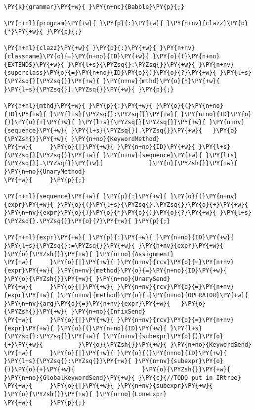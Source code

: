 \begin{Verbatim}[commandchars=\\\{\}]
\PY{k}{grammar}\PY{+w}{ }\PY{n+nc}{Babble}\PY{p}{;}

\PY{n+nl}{program}\PY{+w}{ }\PY{p}{:}\PY{+w}{ }\PY{n+nv}{clazz}\PY{o}{*}\PY{+w}{ }\PY{p}{;}

\PY{n+nl}{clazz}\PY{+w}{ }\PY{p}{:}\PY{+w}{ }\PY{n+nv}{classname}\PY{o}{=}\PY{n+no}{ID}\PY{+w}{ }\PY{o}{(}\PY{n+no}{EXTENDS}\PY{+w}{ }\PY{l+s}{\PYZsq{}:\PYZsq{}}\PY{+w}{ }\PY{n+nv}{superclass}\PY{o}{=}\PY{n+no}{ID}\PY{o}{)}\PY{o}{?}\PY{+w}{ }\PY{l+s}{\PYZsq{}[\PYZsq{}}\PY{+w}{ }\PY{n+nv}{mthd}\PY{o}{*}\PY{+w}{ }\PY{l+s}{\PYZsq{}].\PYZsq{}}\PY{+w}{ }\PY{p}{;}

\PY{n+nl}{mthd}\PY{+w}{ }\PY{p}{:}\PY{+w}{ }\PY{o}{(}\PY{n+no}{ID}\PY{+w}{ }\PY{l+s}{\PYZsq{}:\PYZsq{}}\PY{+w}{ }\PY{n+no}{ID}\PY{o}{)}\PY{o}{+}\PY{+w}{ }\PY{l+s}{\PYZsq{}[\PYZsq{}}\PY{+w}{ }\PY{n+nv}{sequence}\PY{+w}{ }\PY{l+s}{\PYZsq{}].\PYZsq{}}\PY{+w}{   }\PY{o}{\PYZsh{}}\PY{+w}{ }\PY{n+no}{KeywordMethod}
\PY{+w}{     }\PY{o}{|}\PY{+w}{ }\PY{n+no}{ID}\PY{+w}{ }\PY{l+s}{\PYZsq{}[\PYZsq{}}\PY{+w}{ }\PY{n+nv}{sequence}\PY{+w}{ }\PY{l+s}{\PYZsq{}].\PYZsq{}}\PY{+w}{             }\PY{o}{\PYZsh{}}\PY{+w}{ }\PY{n+no}{UnaryMethod}
\PY{+w}{     }\PY{p}{;}

\PY{n+nl}{sequence}\PY{+w}{ }\PY{p}{:}\PY{+w}{ }\PY{o}{(}\PY{n+nv}{expr}\PY{+w}{ }\PY{o}{(}\PY{l+s}{\PYZsq{}.\PYZsq{}}\PY{o}{+}\PY{+w}{ }\PY{n+nv}{expr}\PY{o}{)}\PY{o}{*}\PY{o}{)}\PY{o}{?}\PY{+w}{ }\PY{l+s}{\PYZsq{}.\PYZsq{}}\PY{o}{?}\PY{+w}{ }\PY{p}{;}

\PY{n+nl}{expr}\PY{+w}{ }\PY{p}{:}\PY{+w}{ }\PY{n+no}{ID}\PY{+w}{ }\PY{l+s}{\PYZsq{}:=\PYZsq{}}\PY{+w}{ }\PY{n+nv}{expr}\PY{+w}{                        }\PY{o}{\PYZsh{}}\PY{+w}{ }\PY{n+no}{Assignment}
\PY{+w}{     }\PY{o}{|}\PY{+w}{ }\PY{n+nv}{rcv}\PY{o}{=}\PY{n+nv}{expr}\PY{+w}{ }\PY{n+nv}{method}\PY{o}{=}\PY{n+no}{ID}\PY{+w}{                  }\PY{o}{\PYZsh{}}\PY{+w}{ }\PY{n+no}{UnarySend}
\PY{+w}{     }\PY{o}{|}\PY{+w}{ }\PY{n+nv}{rcv}\PY{o}{=}\PY{n+nv}{expr}\PY{+w}{ }\PY{n+nv}{method}\PY{o}{=}\PY{n+no}{OPERATOR}\PY{+w}{ }\PY{n+nv}{arg}\PY{o}{=}\PY{n+nv}{expr}\PY{+w}{   }\PY{o}{\PYZsh{}}\PY{+w}{ }\PY{n+no}{InfixSend}
\PY{+w}{     }\PY{o}{|}\PY{+w}{ }\PY{n+nv}{rcv}\PY{o}{=}\PY{n+nv}{expr}\PY{+w}{ }\PY{o}{(}\PY{n+no}{ID}\PY{+w}{ }\PY{l+s}{\PYZsq{}:\PYZsq{}}\PY{+w}{ }\PY{n+nv}{subexpr}\PY{o}{)}\PY{o}{+}\PY{+w}{          }\PY{o}{\PYZsh{}}\PY{+w}{ }\PY{n+no}{KeywordSend}
\PY{+w}{     }\PY{o}{|}\PY{+w}{ }\PY{o}{(}\PY{n+no}{ID}\PY{+w}{ }\PY{l+s}{\PYZsq{}:\PYZsq{}}\PY{+w}{ }\PY{n+nv}{subexpr}\PY{o}{)}\PY{o}{+}\PY{+w}{                   }\PY{o}{\PYZsh{}}\PY{+w}{ }\PY{n+no}{GlobalKeywordSend}\PY{+w}{ }\PY{c}{//TODO put in IRtree}
\PY{+w}{     }\PY{o}{|}\PY{+w}{ }\PY{n+nv}{subexpr}\PY{+w}{                             }\PY{o}{\PYZsh{}}\PY{+w}{ }\PY{n+no}{LoneExpr}
\PY{+w}{     }\PY{p}{;}


\end{Verbatim}
